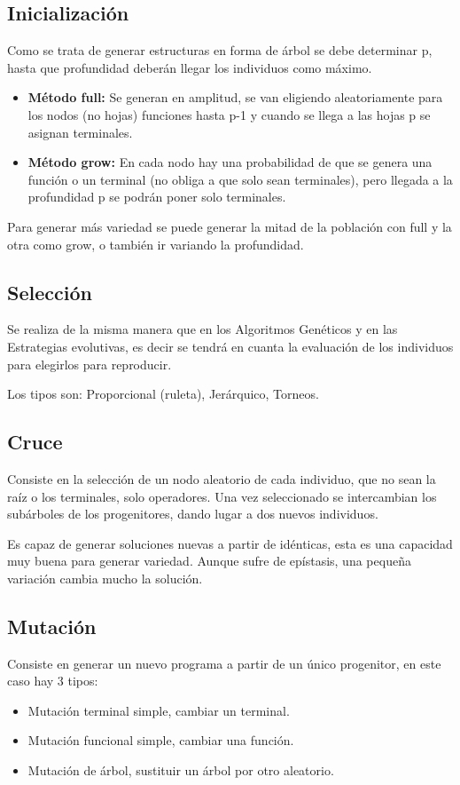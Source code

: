 \documentclass[12pt, twoside, openright]{report} %
\begin{document}
\subsection{Inicialización}
Como se trata de generar estructuras en forma de árbol se debe determinar p, hasta que profundidad deberán llegar los individuos como máximo.
\begin{itemize}
	\item \textbf{Método full:} Se generan en amplitud, se van eligiendo aleatoriamente para los nodos (no hojas) funciones hasta p-1 y cuando se llega a las hojas p se asignan terminales.
	\item \textbf{Método grow:} En cada nodo hay una probabilidad de que se genera una función o un terminal (no obliga a que solo sean terminales), pero llegada a la profundidad p se podrán poner solo terminales.
\end{itemize}
Para generar más variedad se puede generar la mitad de la población con full y la otra como grow, o también ir variando la profundidad.
\vspace{-.5cm}
\subsection{Selección}
Se realiza de la misma manera que en los Algoritmos Genéticos y en las Estrategias evolutivas, es decir se tendrá en cuanta la evaluación de los individuos para elegirlos para reproducir.

Los tipos son: Proporcional (ruleta), Jerárquico, Torneos.

\subsection{Cruce}
Consiste en la selección de un nodo aleatorio de cada individuo, que no sean la raíz o los terminales, solo operadores. Una vez seleccionado se intercambian los subárboles de los progenitores, dando lugar a dos nuevos individuos.

Es capaz de generar soluciones nuevas a partir de idénticas, esta es una capacidad muy buena para generar variedad. Aunque sufre de epístasis, una pequeña variación cambia mucho la solución.

\subsection{Mutación}
Consiste en generar un nuevo programa a partir de un único progenitor, en este caso hay 3 tipos:
\begin{itemize}
	\item Mutación terminal simple, cambiar un terminal.
	\item Mutación funcional simple, cambiar una función.
	\item Mutación de árbol, sustituir un árbol por otro aleatorio.
\end{itemize}
\end{document}
